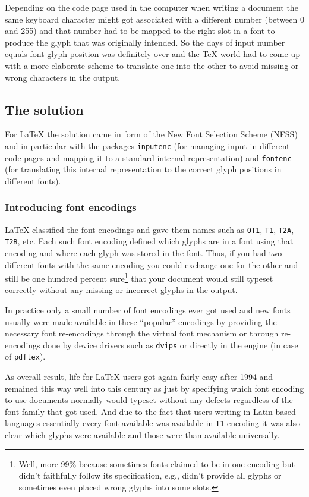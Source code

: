 \documentclass{ltugboat}
\newcommand\LPack[1]{\texttt{#1}}
\newcommand\Prog[1]{\texttt{#1}}
\begin{document}
Depending on the code page used in the computer when writing a
document the same keyboard character might got associated with a
different number (between 0 and 255) and that number had to be mapped
to the right slot in a font to produce the glyph that was originally
intended. So the days of input number equals font glyph position was
definitely over and the \TeX{} world had to come up with a more
elaborate scheme to translate one into the other to avoid missing or
wrong characters in the output.


\subsection{The \LaTeXe{} solution}

For \LaTeX{} the solution came in form of the New Font Selection
Scheme (NFSS)~\cite{} and in particular with the packages
\LPack{inputenc} (for managing input in different code pages and
mapping it to a standard internal representation) and \LPack{fontenc}
(for translating this internal representation to the correct glyph
positions in different fonts).


\subsubsection{Introducing font encodings}

\LaTeX{} classified the font encodings and gave them names such as
\texttt{OT1}, \texttt{T1}, \texttt{T2A}, \texttt{T2B}, etc. Each such
font encoding defined which glyphs are in a font using that encoding
and where each glyph was stored in the font. Thus, if you had two
different fonts with the same encoding you could exchange one for the
other and still be one hundred percent sure\footnote{Well, more 99\%
  because sometimes fonts claimed to be in one encoding but didn't
  faithfully follow its specification, e.g., didn't provide all
  glyphs or sometimes even placed wrong glyphs into some slots.}
that your document would still typeset correctly without any missing
or incorrect glyphs in the output.

In practice only a small number of font encodings ever got used and
new fonts usually were made available in these ``popular'' encodings
by providing the necessary font re-encodings through the virtual font
mechanism or through re-encodings done by device drivers such as
\Prog{dvips} or directly in the engine (in case of \Prog{pdftex}).

As overall result, life for \LaTeX{} users got again fairly easy after
1994 and remained this way well into this century as just by
specifying which font encoding to use documents normally would typeset
without any defects regardless of the font family that got used. And
due to the fact that users writing in Latin-based languages
essentially every font available was available in \texttt{T1} encoding
it was also clear which glyphs were available and those were than
available universally.
\end{document}
